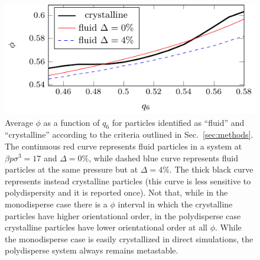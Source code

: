 \documentclass[twocolumn,superscriptaddress]{revtex4}
\begin{document}
\begin{figure}
 \centering
 \includegraphics{fig_stability_map}
 \caption{Average $\phi$ as a function of $q_6$ for particles identified as ``fluid'' and ``crystalline'' according to the criteria outlined in Sec.~\ref{sec:methods}. The continuous red curve represents fluid particles in a system at $\beta p\sigma^3=17$ and $\Delta=0\%$, while dashed blue curve represents fluid particles at the same pressure but at $\Delta=4\%$. The thick black curve represents instead crystalline particles (this curve is less sensitive to polydispersity and it is reported once).
 Not that, while in the monodisperse case there is a $\phi$ interval in which the crystalline particles have higher orientational order, in the polydisperse
 case crystalline particles have lower orientational order at all $\phi$. While the monodisperse case is easily crystallized in direct simulations, the polydisperse
 system always remains metastable.}
 \label{fig:stability_map}
\end{figure}
\end{document}

